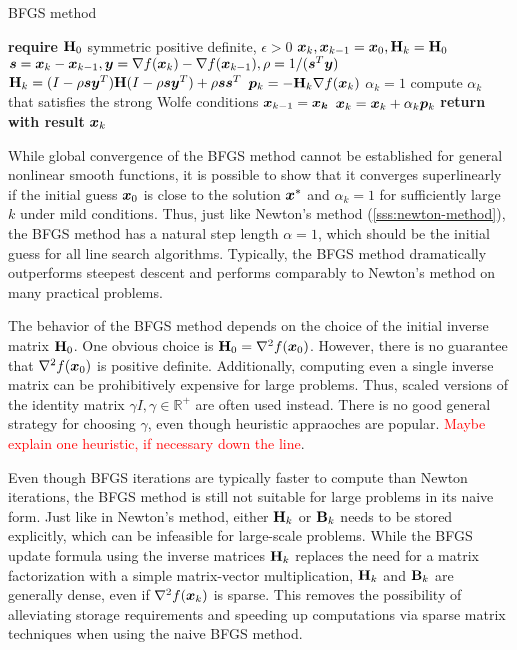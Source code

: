 \begin{algorithm}
\caption{BFGS method}\label{alg:bfgs}
\begin{algorithmic}
\State \textbf{require } $\mathbf{H}_0$ symmetric positive definite, $\epsilon > 0$
\State $\bm{x}_k, \bm{x}_{k-1} = \bm{x}_0, \mathbf{H}_k = \mathbf{H}_0 $
\State $\bm{s} = \bm{x}_k - \bm{x}_{k-1}, \bm{y} = \nabla f(\bm{x}_k) - \nabla f(\bm{x}_{k-1}), \rho = 1 / (\bm{s}^T \bm{y})$
\State $\mathbf{H}_k = (I - \rho \bm{s} \bm{y}^T) \mathbf{H}(I - \rho \bm{s} \bm{y}^T) + \rho\bm{s}\bm{s}^T$
\State $\bm{p}_k = -\mathbf{H}_k \nabla f(\bm{x}_k)$
\State $\alpha_k = 1$
\State compute $\alpha_k$ that satisfies the strong Wolfe conditions
\EndIf
\State $\bm{x}_{k-1} = \bm{x_k}$
\State $\bm{x}_k = \bm{x}_k + \alpha_k \bm{p}_k$
\EndWhile
\State \textbf{return with result } $\bm{x}_k$
\EndProcedure
\end{algorithmic}
\end{algorithm}

While global convergence of the BFGS method cannot be established for general nonlinear smooth functions, it is possible to show that it converges 
superlinearly if the initial guess $\bm{x}_0$ is close to the solution $\bm{x}^*$ and $\alpha_k = 1$ for sufficiently large $k$ 
under mild conditions. Thus, just like Newton's method (\cref{sss:newton-method}), the BFGS method has a natural step length $\alpha=1$,
which should be the initial guess for all line search algorithms. Typically, the BFGS method dramatically outperforms steepest 
descent and performs comparably to Newton's method on many practical problems. 

The behavior of the BFGS method depends on the choice of the initial inverse matrix $\mathbf{H}_0$. One obvious choice is $\mathbf{H}_0 = \nabla^2 
f(\bm{x}_0)$. However, there is no guarantee that $\nabla^2 f(\bm{x}_0)$ is positive definite. Additionally, computing even a single inverse
matrix can be prohibitively expensive for large problems. Thus, scaled versions of the identity matrix $\gamma I, \gamma \in \mathbb{R}^+$ are
often used instead. There is no good general strategy for choosing $\gamma$, even though heuristic appraoches are popular. \textcolor{red}{Maybe
explain one heuristic, if necessary down the line}.

Even though BFGS iterations are typically faster to compute than Newton iterations, the BFGS method is still not suitable for large problems 
in its naive form. Just like in Newton's method, either $\mathbf{H}_k$ or $\mathbf{B}_k$ needs to be stored explicitly, which can be infeasible for 
large-scale problems. While the BFGS update formula using the inverse matrices $\mathbf{H}_k$ replaces the need for a matrix factorization with a simple 
matrix-vector multiplication, $\mathbf{H}_k$ and $\mathbf{B}_k$ are generally dense, even if $\nabla^2 f(\bm{x}_k)$ is sparse. This removes the possibility
of alleviating storage requirements and speeding up computations via sparse matrix techniques when using the naive BFGS method.

